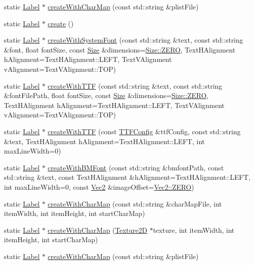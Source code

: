 \begin{Indent}
\begin{DoxyCompactItemize}
\item 
static \hyperlink{classLabel}{Label} $\ast$ \hyperlink{classLabel_a169b27372e6b30d70651a01ff561df5d}{create\+With\+Char\+Map} (const std\+::string \&plist\+File)
\item 
static \hyperlink{classLabel}{Label} $\ast$ \hyperlink{classLabel_ab071a3f4ccdf8122b1c0c9802b17d009}{create} ()
\item 
static \hyperlink{classLabel}{Label} $\ast$ \hyperlink{classLabel_a986ff8a66abb2bc0f37fd8b941fc4360}{create\+With\+System\+Font} (const std\+::string \&text, const std\+::string \&font, float font\+Size, const \hyperlink{classSize}{Size} \&dimensions=\hyperlink{classSize_a724334f12c8ef877c36b3f69e1257aa7}{Size\+::\+Z\+E\+RO}, Text\+H\+Alignment h\+Alignment=Text\+H\+Alignment\+::\+L\+E\+FT, Text\+V\+Alignment v\+Alignment=Text\+V\+Alignment\+::\+T\+OP)
\item 
static \hyperlink{classLabel}{Label} $\ast$ \hyperlink{classLabel_a629c9a853d67f5accbe2f08823338295}{create\+With\+T\+TF} (const std\+::string \&text, const std\+::string \&font\+File\+Path, float font\+Size, const \hyperlink{classSize}{Size} \&dimensions=\hyperlink{classSize_a724334f12c8ef877c36b3f69e1257aa7}{Size\+::\+Z\+E\+RO}, Text\+H\+Alignment h\+Alignment=Text\+H\+Alignment\+::\+L\+E\+FT, Text\+V\+Alignment v\+Alignment=Text\+V\+Alignment\+::\+T\+OP)
\item 
static \hyperlink{classLabel}{Label} $\ast$ \hyperlink{classLabel_a46839ddb0c962a638525132f539fa3c9}{create\+With\+T\+TF} (const \hyperlink{structTTFConfig}{T\+T\+F\+Config} \&ttf\+Config, const std\+::string \&text, Text\+H\+Alignment h\+Alignment=Text\+H\+Alignment\+::\+L\+E\+FT, int max\+Line\+Width=0)
\item 
static \hyperlink{classLabel}{Label} $\ast$ \hyperlink{classLabel_a4ce3b60da1edc9f4bc9882e608c4e01a}{create\+With\+B\+M\+Font} (const std\+::string \&bmfont\+Path, const std\+::string \&text, const Text\+H\+Alignment \&h\+Alignment=Text\+H\+Alignment\+::\+L\+E\+FT, int max\+Line\+Width=0, const \hyperlink{classVec2}{Vec2} \&image\+Offset=\hyperlink{classVec2_a5c80e2e7c8bd2adcbad2844d060e6245}{Vec2\+::\+Z\+E\+RO})
\item 
static \hyperlink{classLabel}{Label} $\ast$ \hyperlink{classLabel_a13b9884cfcf184f9e4bf30be8389e49a}{create\+With\+Char\+Map} (const std\+::string \&char\+Map\+File, int item\+Width, int item\+Height, int start\+Char\+Map)
\item 
static \hyperlink{classLabel}{Label} $\ast$ \hyperlink{classLabel_afec3c62e813a008c748eee99e3265118}{create\+With\+Char\+Map} (\hyperlink{classTexture2D}{Texture2D} $\ast$texture, int item\+Width, int item\+Height, int start\+Char\+Map)
\item 
static \hyperlink{classLabel}{Label} $\ast$ \hyperlink{classLabel_adc28b67efdaf4890cad4472a42c92c88}{create\+With\+Char\+Map} (const std\+::string \&plist\+File)
\end{DoxyCompactItemize}
\end{Indent}
